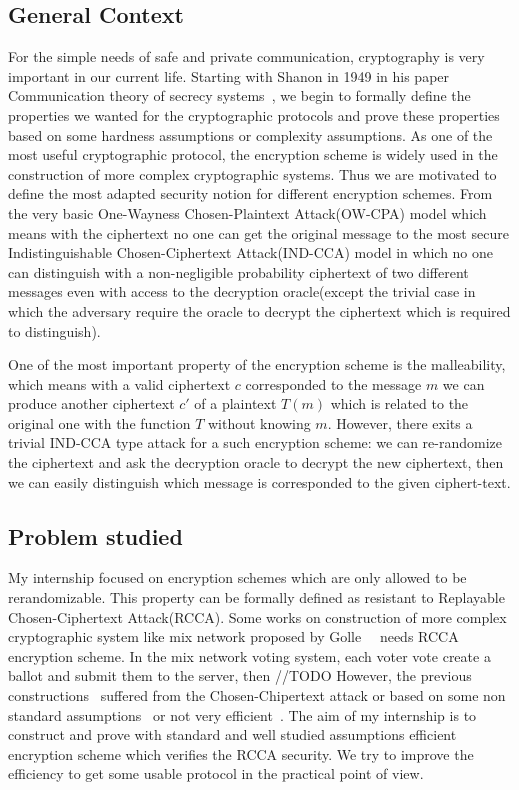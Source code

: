 \subsection*{General Context}

For the simple needs of safe and private communication, cryptography is very important in our current life. 
Starting with Shanon in 1949 in his paper Communication theory of secrecy systems~\cite{shannon-otp},
we begin to formally define the properties we wanted for the cryptographic protocols and prove these properties based on some hardness assumptions or complexity assumptions.
As one of the most useful cryptographic protocol, the encryption scheme is widely used in the construction of more complex cryptographic systems.
Thus we are motivated to define the most adapted security notion for different encryption schemes. 
From the very basic One-Wayness Chosen-Plaintext Attack(OW-CPA) model which means with the ciphertext no one can get the original message
to the most secure Indistinguishable Chosen-Ciphertext Attack(IND-CCA) model
in which no one can distinguish with a non-negligible probability ciphertext of two different messages even with access to the decryption oracle(except the trivial case in which the adversary require the oracle to decrypt the ciphertext which is required to distinguish). 

One of the most important property of the encryption scheme is the malleability, 
which means with a valid ciphertext $c$ corresponded to the message $m$ we can produce another ciphertext $c'$ of a plaintext $T(m)$ which is related to the original one with the function $T$ without knowing $m$.
However, there exits a trivial IND-CCA type attack for a such encryption scheme: we can re-randomize the ciphertext and ask the decryption oracle to decrypt the new ciphertext, then we can easily distinguish which message is corresponded to the given ciphert-text.

\subsection*{Problem studied}
My internship focused on encryption schemes which are only allowed to be rerandomizable.
This property can be formally defined as resistant to Replayable Chosen-Ciphertext Attack(RCCA).
Some works on construction of more complex cryptographic system like mix network proposed by Golle~\etal~\cite{DBLP:conf/ctrsa/GolleJJS04} needs RCCA encryption scheme.
In the mix network voting system, each voter vote create a ballot and submit them to the server, then //TODO
However, the previous constructions~\cite{DBLP:conf/ctrsa/GolleJJS04} suffered from the Chosen-Chipertext attack or based on some non standard assumptions~\cite{DBLP:conf/crypto/PrabhakaranR07} or not very efficient~\cite{DBLP:conf/eurocrypt/ChaseKLM12}.
The aim of my internship is to construct and prove with standard and well studied assumptions efficient encryption scheme which verifies the RCCA security.
We try to improve the efficiency to get some usable protocol in the practical point of view.

